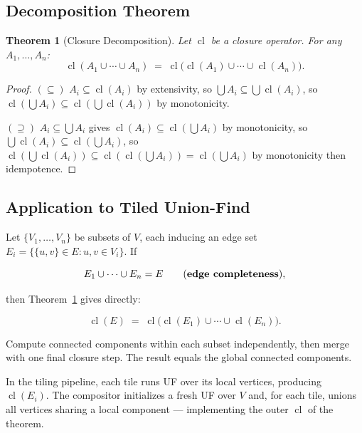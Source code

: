\documentclass[11pt]{article}
\newtheorem{theorem}{Theorem}
\begin{document}
\subsection{Decomposition Theorem}

\begin{theorem}[Closure Decomposition]
\label{thm:decomposition}
Let $\operatorname{cl}$ be a closure operator.
For any $A_1, \ldots, A_n$:
\[
    \operatorname{cl}(A_1 \cup \cdots \cup A_n)
    \;=\;
    \operatorname{cl}\!\bigl(
        \operatorname{cl}(A_1) \cup \cdots \cup \operatorname{cl}(A_n)
    \bigr).
\]
\end{theorem}

\begin{proof}
$(\subseteq)$\;
$A_i \subseteq \operatorname{cl}(A_i)$ by extensivity, so
$\bigcup A_i \subseteq \bigcup \operatorname{cl}(A_i)$, so
$\operatorname{cl}(\bigcup A_i) \subseteq
\operatorname{cl}(\bigcup \operatorname{cl}(A_i))$ by monotonicity.

\smallskip\noindent
$(\supseteq)$\;
$A_i \subseteq \bigcup A_i$ gives
$\operatorname{cl}(A_i) \subseteq \operatorname{cl}(\bigcup A_i)$
by monotonicity, so
$\bigcup \operatorname{cl}(A_i) \subseteq \operatorname{cl}(\bigcup A_i)$,
so $\operatorname{cl}(\bigcup \operatorname{cl}(A_i)) \subseteq
\operatorname{cl}(\operatorname{cl}(\bigcup A_i))
= \operatorname{cl}(\bigcup A_i)$
by monotonicity then idempotence.
\end{proof}

\subsection{Application to Tiled Union-Find}

Let $\{V_1, \ldots, V_n\}$ be subsets of $V$, each inducing an edge set
$E_i = \bigl\{\{u,v\} \in E : u, v \in V_i\bigr\}$. If

\[
    E_1 \cup \cdots \cup E_n = E
    \qquad\text{(\textbf{edge completeness})},
\]

then Theorem~\ref{thm:decomposition} gives directly:

\[
    \operatorname{cl}(E)
    \;=\;
    \operatorname{cl}\!\bigl(
        \operatorname{cl}(E_1) \cup \cdots \cup \operatorname{cl}(E_n)
    \bigr).
\]

Compute connected components within each subset independently, then
merge with one final closure step. The result equals the global
connected components.

In the tiling pipeline, each tile runs UF over its local vertices,
producing $\operatorname{cl}(E_i)$. The compositor initializes a fresh
UF over $V$ and, for each tile, unions all vertices sharing a local
component --- implementing the outer $\operatorname{cl}$ of the theorem.
\end{document}
